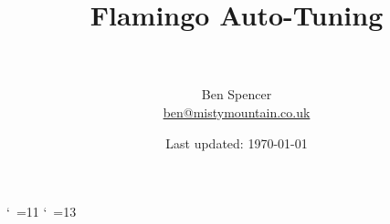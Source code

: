 


\captionsetup{margin=30pt,font=small,labelfont=bf}







\newcommand{\treeDrawABCDEF}{%
    \[\begin{tikzpicture}
        \node{$\{A, B\}$}
            child{node {$\{C, D\}$}}
            child{node {$\{E, F\}$}}
        ;
    \end{tikzpicture}\]
}




\catcode`~=11 %
\newcommand{\urltilde}{\kern -.15em\lower .7ex\hbox{~}\kern .04em}
\catcode`~=13 %




\newcommand{\thedocumenttitle}{}
\newcommand{\documenttitle}[1]{%
    \renewcommand{\thedocumenttitle}{#1}
}



\title{Flamingo Auto-Tuning\\\decofourleft~~~\thedocumenttitle~~~\decofourright}
\author{Ben Spencer\\\normalsize\href{mailto:ben@mistymountain.co.uk}{ben@mistymountain.co.uk}}
\date{Last updated: \today}



